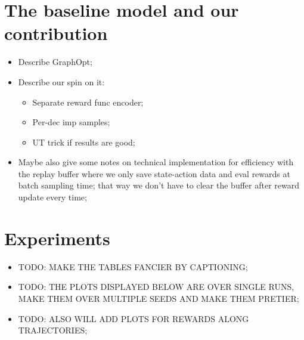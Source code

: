 \documentclass{report}
\numberwithin{equation}{section}
\numberwithin{figure}{section}
\numberwithin{table}{section}
\numberwithin{algorithm}{section}
\begin{document}
\chapter{The baseline model and our contribution}\label{chap:contribution}
\begin{itemize}
  \item Describe GraphOpt;
  \item Describe our spin on it:
  \begin{itemize}
    \item Separate reward func encoder;
    \item Per-dec imp samples;
    \item UT trick if results are good;
  \end{itemize}
  \item Maybe also give some notes on technical 
  implementation for efficiency with the replay buffer 
  where we only save state-action data and eval rewards 
  at batch sampling time; that way we don't have to clear the 
  buffer after reward update every time;
\end{itemize}

\chapter{Experiments}\label{chap:experiments}

\begin{itemize}
  \item TODO: MAKE THE TABLES FANCIER BY CAPTIONING;
  \item TODO: THE PLOTS DISPLAYED BELOW ARE OVER SINGLE RUNS, 
  MAKE THEM OVER MULTIPLE SEEDS AND MAKE THEM PRETIER;
  \item TODO: ALSO WILL ADD PLOTS FOR REWARDS ALONG TRAJECTORIES;
\end{itemize}
\end{document}
